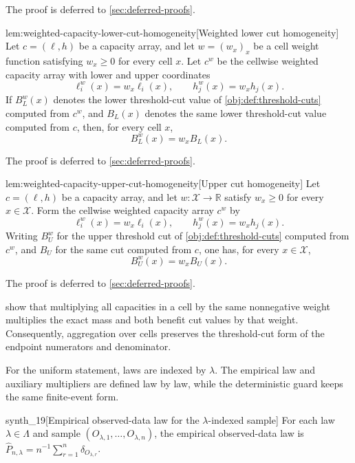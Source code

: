 \documentclass[11pt]{article}
\begin{document}
The proof is deferred to \cref{sec:deferred-proofs}.

\begin{lemmav}{lem:weighted-capacity-lower-cut-homogeneity}[Weighted lower cut homogeneity]
Let \(c=(\ell,h)\) be a capacity array, and let \(w=(w_x)_x\) be a cell weight function satisfying \(w_x\ge 0\) for every cell \(x\).  Let \(c^w\) be the cellwise weighted capacity array with lower and upper coordinates
\[
\ell_i^w(x)=w_x\ell_i(x),
\qquad
h_j^w(x)=w_xh_j(x).
\]
If \(B_L^w(x)\) denotes the lower threshold-cut value of \cref{obj:def:threshold-cuts} computed from \(c^w\), and \(B_L(x)\) denotes the same lower threshold-cut value computed from \(c\), then, for every cell \(x\),
\[
B_L^w(x)=w_x B_L(x).
\]
\end{lemmav}

The proof is deferred to \cref{sec:deferred-proofs}.

\begin{lemmav}{lem:weighted-capacity-upper-cut-homogeneity}[Upper cut homogeneity]
Let \(c=(\ell,h)\) be a capacity array, and let \(w:\mathcal X\to\mathbb R\) satisfy \(w_x\ge 0\) for every \(x\in\mathcal X\).  Form the cellwise weighted capacity array \(c^w\) by
\[
\ell_i^w(x)=w_x\ell_i(x),
\qquad
h_j^w(x)=w_xh_j(x).
\]
Writing \(B_U^w\) for the upper threshold cut of \cref{obj:def:threshold-cuts} computed from \(c^w\), and \(B_U\) for the same cut computed from \(c\), one has, for every \(x\in\mathcal X\),
\[
B_U^w(x)=w_x B_U(x).
\]
\end{lemmav}

The proof is deferred to \cref{sec:deferred-proofs}.

 show that multiplying all capacities in a cell by the same nonnegative weight multiplies the exact mass and both benefit cut values by that weight.  Consequently, aggregation over cells preserves the threshold-cut form of the endpoint numerators and denominator.

For the uniform statement, laws are indexed by \(\lambda\).  The empirical law and auxiliary multipliers are defined law by law, while the deterministic guard keeps the same finite-event form.

\begin{definitionv}{synth_19}[Empirical observed-data law for the \(\lambda\)-indexed sample]
For each law \(\lambda\in\Lambda\) and sample \((O_{\lambda,1},\ldots,O_{\lambda,n})\), the empirical observed-data law is \(\widehat P_{n,\lambda}=n^{-1}\sum_{r=1}^n\delta_{O_{\lambda,r}}\).
\end{definitionv}
\end{document}
